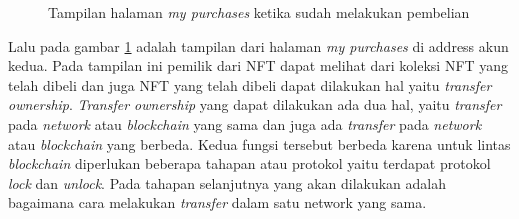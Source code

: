       \begin{figure} [H] \centering
        \caption{Tampilan halaman \emph{my purchases} ketika sudah melakukan pembelian}
        \label{fig:my_purchases}
        \end{figure}
       Lalu pada gambar \ref{fig:my_purchases} adalah tampilan dari halaman \emph{my purchases} di address akun kedua. Pada tampilan ini pemilik dari NFT dapat melihat dari koleksi NFT yang telah dibeli dan juga NFT yang telah dibeli dapat dilakukan hal yaitu \emph{transfer ownership}. \emph{Transfer ownership} yang dapat dilakukan ada dua hal, yaitu \emph{transfer} pada \emph{network} atau \emph{blockchain} yang sama dan juga ada \emph{transfer} pada \emph{network} atau \emph{blockchain} yang berbeda. Kedua fungsi tersebut berbeda karena untuk lintas \emph{blockchain} diperlukan beberapa tahapan atau protokol yaitu terdapat protokol \emph{lock} dan \emph{unlock}. Pada tahapan selanjutnya yang akan dilakukan adalah bagaimana cara melakukan \emph{transfer} dalam satu network yang sama.

